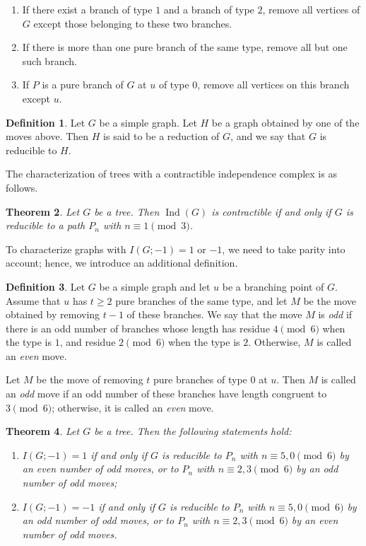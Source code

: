 \documentclass[12pt,amscd]{amsart}
\newtheorem{thm}{Theorem}[section]
\theoremstyle{definition}
\newtheorem{defn}[thm]{Definition}
\numberwithin{equation}{section}
\DeclareMathOperator{\Ind}{Ind}
\begin{document}
\begin{enumerate}
    \item If there exist a branch of type $1$ and a branch of type $2$, remove all vertices of $G$ except those belonging to these two branches.
    \item If there is more than one pure branch of the same type, remove all but one such branch.
    \item If $P$ is a pure branch of $G$ at $u$ of type $0$, remove all vertices on this branch except $u$.    
\end{enumerate}

\begin{defn}
Let $G$ be a simple graph. Let $H$ be a graph obtained by one of the moves above. Then $H$ is said to be a reduction of $G$, and we say that $G$ is reducible to $H$.
\end{defn}

The characterization of trees with a contractible independence complex is as follows.

\begin{thm}\label{thm_contractible} 
Let $G$ be a tree. Then $\Ind(G)$ is contractible if and only if $G$ is reducible to a path $P_n$ with $n \equiv 1 \pmod{3}$.
\end{thm}

To characterize graphs with \( I(G;-1) = 1 \) or \( -1 \), we need to take parity into account; hence, we introduce an additional definition.

\begin{defn}
Let \( G \) be a simple graph and let \( u \) be a branching point of \( G \). Assume that \( u \) has \( t \ge 2 \) pure branches of the same type, and let \( M \) be the move obtained by removing \( t-1 \) of these branches. We say that the move \( M \) is \emph{odd} if there is an odd number of branches whose length has residue \( 4 \pmod{6} \) when the type is \( 1 \), and residue \( 2 \pmod{6} \) when the type is \( 2 \). Otherwise, \( M \) is called an \emph{even} move.

Let \( M \) be the move of removing \( t \) pure branches of type \( 0 \) at \( u \). Then \( M \) is called an \emph{odd} move if an odd number of these branches have length congruent to \( 3 \pmod{6} \); otherwise, it is called an \emph{even} move.
\end{defn}

\begin{thm}\label{thm_pm1}
Let \( G \) be a tree. Then the following statements hold:
\begin{enumerate}
    \item \( I(G; -1) = 1 \) if and only if \( G \) is reducible to \( P_n \) with \( n \equiv 5,0 \pmod{6} \) by an even number of odd moves, or to \( P_n \) with \( n \equiv 2,3 \pmod{6} \) by an odd number of odd moves;
    \item \( I(G; -1) = -1 \) if and only if \( G \) is reducible to \( P_n \) with \( n \equiv 5,0 \pmod{6} \) by an odd number of odd moves, or to \( P_n \) with \( n \equiv 2,3 \pmod{6} \) by an even number of odd moves.
\end{enumerate}
\end{thm}
\end{document}
